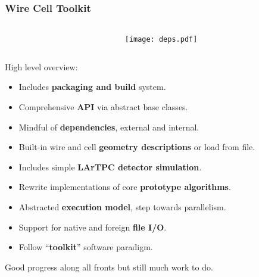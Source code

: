 \documentclass[xcolor=dvipsnames]{beamer}
\begin{document}
\begin{frame}
  \frametitle{Wire Cell Toolkit}
  \begin{columns}
    \begin{column}{0.65\paperwidth}
    \end{column}
    \begin{column}{0.35\paperwidth}
      \vspace{-20mm}
      \texttt{[image: deps.pdf]}      
    \end{column}
  \end{columns}

  \vspace{-15mm}

  High level overview:
  \begin{itemize}
  \item Includes \textbf{packaging and build} system.
  \item Comprehensive \textbf{API} via abstract base classes.
  \item Mindful of \textbf{dependencies}, external and internal.
  \item Built-in wire and cell \textbf{geometry descriptions} or load from file.
  \item Includes simple \textbf{LArTPC detector simulation}.
  \item Rewrite implementations of core \textbf{prototype algorithms}.
  \item Abstracted \textbf{execution model}, step towards parallelism.
  \item Support for native and foreign \textbf{file I/O}.
  \item Follow ``\textbf{toolkit}'' software paradigm.
  \end{itemize}

  \vfill

  Good progress along all fronts but still much work to do.

\end{frame}
\end{document}
